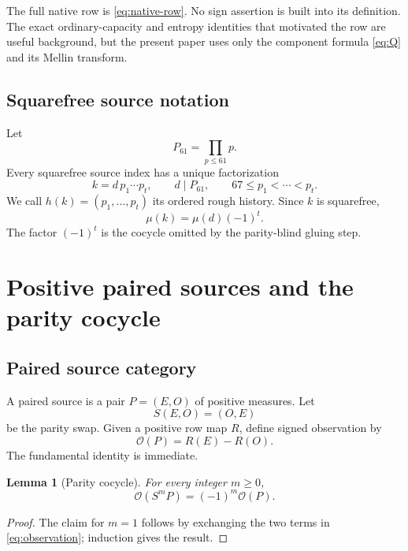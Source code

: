 \documentclass[11pt]{article}
\newtheorem{lemma}[theorem]{Lemma}
\newcommand{\1}{\mathbf 1}
\newcommand{\OO}{\mathcal O}
\begin{document}
The full native row is \eqref{eq:native-row}.  No sign assertion is built into
its definition.  The exact ordinary-capacity and entropy identities that
motivated the row are useful background, but the present paper uses only the
component formula \eqref{eq:Q} and its Mellin transform.

\subsection{Squarefree source notation}

Let
\[
 P_{61}=\prod_{p\le61}p.
\]
Every squarefree source index has a unique factorization
\begin{equation}
 k=d\,p_1\cdots p_t,
 \qquad d\mid P_{61},
 \qquad 67\le p_1<\cdots<p_t.
 \label{eq:factorization}
\end{equation}
We call $h(k)=(p_1,\ldots,p_t)$ its ordered rough history.  Since $k$ is
squarefree,
\begin{equation}
 \mu(k)=\mu(d)(-1)^t.
 \label{eq:mu-parity}
\end{equation}
The factor $(-1)^t$ is the cocycle omitted by the parity-blind gluing step.

\section{Positive paired sources and the parity cocycle}

\subsection{Paired source category}

A paired source is a pair $P=(E,O)$ of positive measures.  Let
\[
 S(E,O)=(O,E)
\]
be the parity swap.  Given a positive row map $R$, define signed observation by
\begin{equation}
 \OO(P)=R(E)-R(O).
 \label{eq:observation}
\end{equation}
The fundamental identity is immediate.

\begin{lemma}[Parity cocycle]
For every integer $m\ge0$,
\begin{equation}
 \OO(S^mP)=(-1)^m\OO(P).
 \label{eq:parity-cocycle}
\end{equation}
\end{lemma}

\begin{proof}
The claim for $m=1$ follows by exchanging the two terms in
\eqref{eq:observation}; induction gives the result.
\end{proof}
\end{document}
